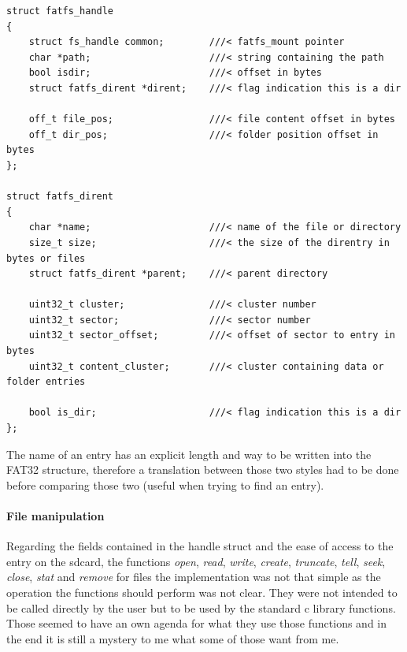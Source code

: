\begin{mdframed}[style=myframe]
\begin{verbatim}
struct fatfs_handle
{
    struct fs_handle common;        ///< fatfs_mount pointer
    char *path;                     ///< string containing the path
    bool isdir;                     ///< offset in bytes
    struct fatfs_dirent *dirent;    ///< flag indication this is a dir

    off_t file_pos;                 ///< file content offset in bytes
    off_t dir_pos;                  ///< folder position offset in bytes
};

struct fatfs_dirent
{
    char *name;                     ///< name of the file or directory
    size_t size;                    ///< the size of the direntry in bytes or files
    struct fatfs_dirent *parent;    ///< parent directory

    uint32_t cluster;               ///< cluster number
    uint32_t sector;                ///< sector number
    uint32_t sector_offset;         ///< offset of sector to entry in bytes
    uint32_t content_cluster;       ///< cluster containing data or folder entries

    bool is_dir;                    ///< flag indication this is a dir
};
\end{verbatim}
\end{mdframed}

The name of an entry has an explicit length and way to be written into the FAT32 structure, therefore a translation between those two styles had to be done before comparing those two (useful when trying to find an entry).

\paragraph{File manipulation}
Regarding the fields contained in the handle struct and the ease of access to the entry on the sdcard, the functions \emph{open}, \emph{read}, \emph{write}, \emph{create}, \emph{truncate}, \emph{tell}, \emph{seek}, \emph{close}, \emph{stat} and \emph{remove} for files the implementation was not that simple as the operation the functions should perform was not clear. They were not intended to be called directly by the user but to be used by the standard c library functions. Those seemed to have an own agenda for what they use those functions and in the end it is still a mystery to me what some of those want from me.

